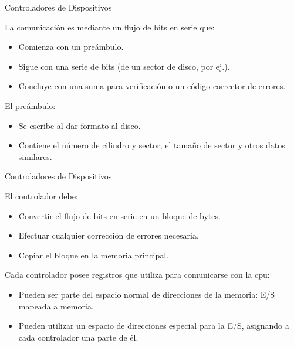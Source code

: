 \documentclass{beamer}
\begin{document}
\begin{frame}{Controladores de Dispositivos}
    \begin{block}{La comunicación es mediante un flujo de bits en serie que:}
    \begin{itemize}
        \item Comienza con un preámbulo.
        \item Sigue con una serie de bits (de un sector de disco, por ej.).
        \item Concluye con una suma para verificación o un código corrector de errores.
    \end{itemize}
    \end{block}
    
    \begin{block}{El preámbulo:}
    \begin{itemize}
        \item Se escribe al dar formato al disco.
        \item Contiene el número de cilindro y sector, el tamaño de sector y otros datos similares.
    \end{itemize}
    \end{block}
\end{frame}

\begin{frame}{Controladores de Dispositivos}
    \begin{block}{El controlador debe:}
    \begin{itemize}
        \item Convertir el flujo de bits en serie en un bloque de bytes.
        \item Efectuar cualquier corrección de errores necesaria.
        \item Copiar el bloque en la memoria principal.
    \end{itemize}
    \end{block}
    
    \begin{block}{Cada controlador posee registros que utiliza para comunicarse con la cpu:}
    \begin{itemize}
    \item Pueden ser parte del espacio normal de direcciones de la memoria: E/S mapeada a memoria.
    \item Pueden utilizar un espacio de direcciones especial para la E/S, asignando a cada controlador una parte de él.
    \end{itemize}

    \end{block}
    
\end{frame}
\end{document}

